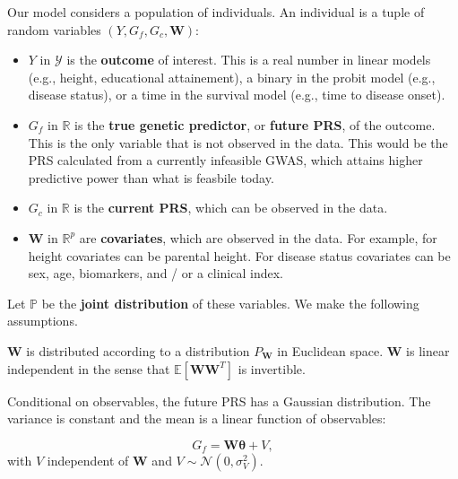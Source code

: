 \documentclass[12pt]{article}
\begin{document}
Our model considers a population of individuals. An individual is a tuple of random variables $(Y, G_f, G_c, \boldsymbol W)$:
\begin{itemize}
    \item $Y$ in $\mathcal{Y}$ is the {\bf outcome} of interest. This is a real number in linear models (e.g., height, educational attainement), a binary in the probit model (e.g., disease status), or a time in the survival model (e.g., time to disease onset).
    \item $G_f$ in $\mathbb R$ is the {\bf true genetic predictor}, or {\bf future PRS}, of the outcome. This is the only variable that is not observed in the data. This would be the PRS calculated from a currently infeasible GWAS, which attains higher predictive power than what is feasbile today.
    \item $G_c$ in $\mathbb R$ is the {\bf current PRS}, which can be observed in the data.
    \item $\boldsymbol W$ in $\mathbb R^p$ are {\bf covariates}, which are observed in the data. For example, for height covariates can be parental height. For disease status covariates can be sex, age, biomarkers, and / or a clinical index.
\end{itemize}

Let $\mathbb P$ be the {\bf joint distribution} of these variables. We make the following assumptions.

\begin{assumption}
    $\boldsymbol W$ is distributed according to a distribution $P_{\boldsymbol W}$ in Euclidean space. $\boldsymbol{W}$ is linear independent in the sense that $\mathbb{E}[\boldsymbol W \boldsymbol W^T]$ is invertible.
    \label{assn:covariates}
\end{assumption}

\begin{assumption}
    Conditional on observables, the future PRS has a Gaussian distribution. The variance is constant and the mean is a linear function of observables:
    
    \begin{equation}
        G_f = \boldsymbol W \boldsymbol \theta + V,
        \label{eq:Gf}
    \end{equation}
    with $V$ independent of $\boldsymbol W$ and $V \sim \mathcal N(0, \sigma^2_V)$.
    \label{assn:future-PGI-normality}
\end{assumption}
\end{document}
